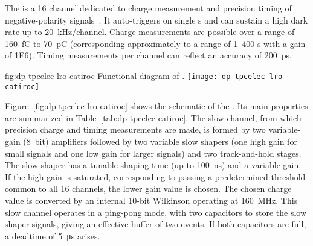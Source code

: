 The  is a \num{16} channel  dedicated to %
charge measurement and precision timing of negative-polarity  signals~\cite{Blin:2017}. It auto-triggers on single \phel{}s and can sustain a high dark rate up to \SI{20}{kHz/channel}. Charge measurements are possible over a range of \SI{160}{fC} to \SI{70}{pC} (corresponding approximately to a range of \numrange{1}{400} \phel{}s with a  gain of \num{1E6}). Timing measurements per channel can reflect an accuracy of \SI{200}{ps}.

\begin{dunefigure}{fig:dp-tpcelec-lro-catiroc}
{Functional diagram of  .}
\texttt{[image: dp-tpcelec-lro-catiroc]}
\end{dunefigure}

Figure~\ref{fig:dp-tpcelec-lro-catiroc} shows the schematic of the  . Its main properties are summarized in Table~\ref{tab:dp-tpcelec-catiroc}. The slow channel, from which precision charge and timing measurements are made, is formed by two variable-gain (\SI{8}{bit}) amplifiers followed by two variable slow shapers (one high gain for small signals and one low gain for larger signals) and two track-and-hold stages. The slow shaper has a tunable shaping time (up to \SI{100}{ns}) and a variable gain.  If the high gain is saturated, corresponding to passing a predetermined threshold common to all \num{16} channels, the lower gain value is chosen. The chosen charge value is converted by an internal 10-bit Wilkinson  operating at \SI{160}{MHz}.  This slow channel operates in a ping-pong mode, with two capacitors to store the slow shaper signals, giving an effective buffer of two events. If both capacitors are full, a deadtime of \SI{5}{\micro\second} arises.



